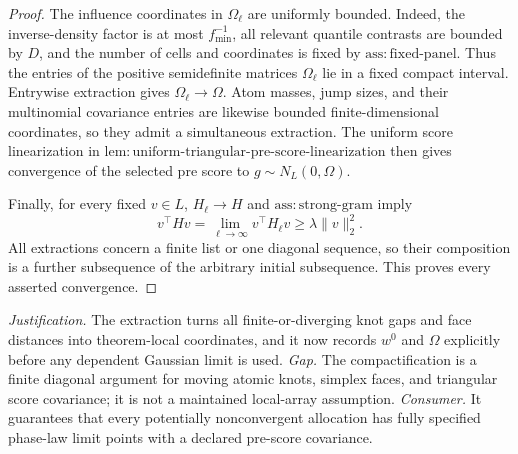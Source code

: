 \documentclass{article}
\begin{document}
\begin{proof}
The influence coordinates in \(\Omega_\ell\) are uniformly bounded.  Indeed, the inverse-density factor is at most \(f_{\min}^{-1}\), all relevant quantile contrasts are bounded by \(D\), and the number of cells and coordinates is fixed by \(\mathrm{ass:fixed\mbox{-}panel}\).  Thus the entries of the positive semidefinite matrices \(\Omega_\ell\) lie in a fixed compact interval.  Entrywise extraction gives \(\Omega_\ell\to\Omega\).  Atom masses, jump sizes, and their multinomial covariance entries are likewise bounded finite-dimensional coordinates, so they admit a simultaneous extraction.  The uniform score linearization in \(\mathrm{lem:uniform\mbox{-}triangular\mbox{-}pre\mbox{-}score\mbox{-}linearization}\) then gives convergence of the selected pre score to \(g\sim N_L(0,\Omega)\).

Finally, for every fixed \(v\in L\), \(H_\ell\to H\) and \(\mathrm{ass:strong\mbox{-}gram}\) imply
\[
 v^\top Hv=\lim_{\ell\to\infty}v^\top H_\ell v
 \geq\lambda\|v\|_2^2.
\]
All extractions concern a finite list or one diagonal sequence, so their composition is a further subsequence of the arbitrary initial subsequence.  This proves every asserted convergence.
\end{proof}
\par\smallskip\noindent \textit{Justification.} The extraction turns all finite-or-diverging knot gaps and face distances into theorem-local coordinates, and it now records \(w^0\) and \(\Omega\) explicitly before any dependent Gaussian limit is used. \textit{Gap.} The compactification is a finite diagonal argument for moving atomic knots, simplex faces, and triangular score covariance; it is not a maintained local-array assumption. \textit{Consumer.} It guarantees that every potentially nonconvergent allocation has fully specified phase-law limit points with a declared pre-score covariance.
\end{document}
